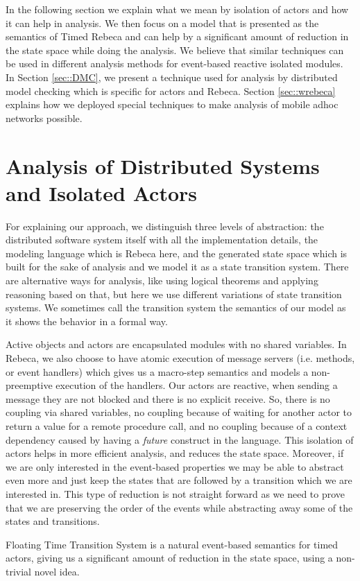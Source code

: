 
In the following section we explain what we mean by isolation of actors and how it can help in analysis. We then focus on a model that is presented as the semantics of Timed Rebeca and can help by a significant amount of reduction in the state space while doing the analysis. We believe that similar techniques can be used in different analysis methods for event-based reactive isolated modules. 
%
In Section \ref{sec::DMC}, we present a technique used for analysis by distributed model checking which is specific for actors and Rebeca.
%
Section \ref{sec::wrebeca} explains how we deployed special techniques to make analysis of  mobile adhoc networks possible.

\section{Analysis of Distributed Systems and Isolated Actors}
For explaining our approach, we distinguish three levels of abstraction: the distributed software system itself with all the implementation details, the modeling language which is Rebeca here, and the generated state space which is built for the sake of analysis and  we model it as a state transition system. There are alternative ways for analysis, like using logical theorems and applying reasoning based on that, but here we use different variations of state transition systems.
We sometimes call the transition system the semantics of our model as it shows the behavior in a formal way.


Active objects and actors are encapsulated modules with no shared variables. In Rebeca, we also choose to have atomic execution of message servers (i.e. methods, or event handlers) which gives us a macro-step semantics and models a non-preemptive execution of the handlers.
Our actors are reactive, when sending a message they are not blocked and there is no explicit receive. So, there is no coupling via shared variables, no coupling because of waiting for another actor to return a value for a remote procedure call, and no coupling because of a context dependency caused by having a \textit{future}  construct in the language.
This isolation of actors helps in more efficient analysis, and reduces the state space.
Moreover, if we are only interested in the event-based properties we may be able to abstract even more and just keep the states that are followed by a transition which we are interested in. This type of reduction is not straight forward as we need to prove that we are preserving the order of the events while abstracting away some of the states and transitions. 

Floating Time Transition System is a natural event-based semantics for timed actors, giving us a significant amount of reduction in the state space, using a non-trivial novel idea.
	